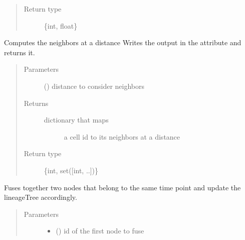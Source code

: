 \documentclass[letterpaper,10pt,english]{sphinxmanual}
\begin{document}
\begin{fulllineitems}
\begin{fulllineitems}
\begin{quote}
\begin{description}
\item[{Return type}] \leavevmode
\{int, float\}

\end{description}\end{quote}

\end{fulllineitems}


\begin{fulllineitems}
\label{\detokenize{index:LineageTree.lineageTree.compute_spatial_edges}}
Computes the neighbors at a distance 
Writes the output in the attribute 
and returns it.
\begin{quote}\begin{description}
\item[{Parameters}] \leavevmode
{} () \textendash{} distance to consider neighbors

\item[{Returns}] \leavevmode
\begin{description}
\item[{dictionary that maps}] \leavevmode
a cell id to its neighbors at a distance 

\end{description}


\item[{Return type}] \leavevmode
\{int, set({[}int, ..{]})\}

\end{description}\end{quote}

\end{fulllineitems}


\begin{fulllineitems}
\label{\detokenize{index:LineageTree.lineageTree.fuse_nodes}}
Fuses together two nodes that belong to the same time point
and update the lineageTree accordingly.
\begin{quote}\begin{description}
\item[{Parameters}] \leavevmode\begin{itemize}
\item {} 
 () \textendash{} id of the first node to fuse


\end{itemize}
\end{description}
\end{quote}
\end{fulllineitems}
\end{fulllineitems}
\end{document}
